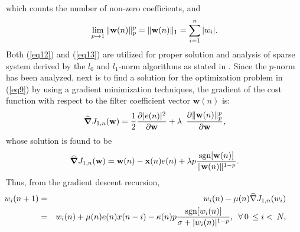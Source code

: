 \noindent which counts the number of non-zero coefficients, and
%
\vspace{-0.1cm}
\begin{equation}
\lim_{p\to 1}\|\textbf{w}(n)\|_p^p=\|\textbf{w}(n)\|_{1}=\sum_{i=1}^{n}|w_i|.\label{eq13}\vspace{-0.1cm}
\end{equation}
\noindent Both (\ref{eq12}) and (\ref{eq13}) are utilized for proper solution and analysis of sparse system derived by the $l_0$ and $l_1$-norm algorithms
 as stated in \cite{Hero}. Since the $p$-norm has been analyzed, next is to find a solution for the optimization problem in (\ref{eq9}) by using a gradient
 minimization techniques, the gradient of the cost function with respect to the filter coefficient vector $\textbf{w}(n)$ is:
\vspace{-0.1cm}
\begin{equation}
\widehat{\boldsymbol\nabla}J_{1,n}(\textbf{w})=\frac{1}{2}\frac{\partial |e(n)|^2}{\partial \textbf{w}}+\lambda\hspace{5pt}\frac{\partial \|\textbf{w}(n)\|_p^p}{\partial \textbf{w}},\label{eq14}\vspace{-0.1cm}
\end{equation}
\noindent whose solution is found to be
\vspace{-0.1cm}
\begin{equation}
\widehat{\boldsymbol\nabla}J_{1,n}(\textbf{w})=\textbf{w}(n)-\textbf{x}(n)e(n) + \lambda p\frac{ \mathrm{sgn}[\textbf{w}(n)]}{\|\textbf{w}(n)\|^{1-p}}.\label{eq15}\vspace{-0.1cm}
\end{equation}
\noindent Thus, from the gradient descent recursion,
\vspace{-0.1cm}
\begin{eqnarray}
\nonumber
\hspace{-0.8cm}w_{i}(n+1)&=&w_{i}(n)-\mu(n)\widehat{\nabla}J_{1,n}(w_i)\\
&=& w_{i}(n)+\mu(n)e(n)x(n-i)-\kappa(n)p \frac{\mathrm{sgn}[w_{i}(n)]}{\sigma+|w_{i}(n)|^{1-p}}, \hspace{5pt}\forall\hspace{2pt} 0\hspace{2pt}\leq i<\hspace{2pt}N, \label{eq16}\vspace{-0.1cm}
\end{eqnarray}

